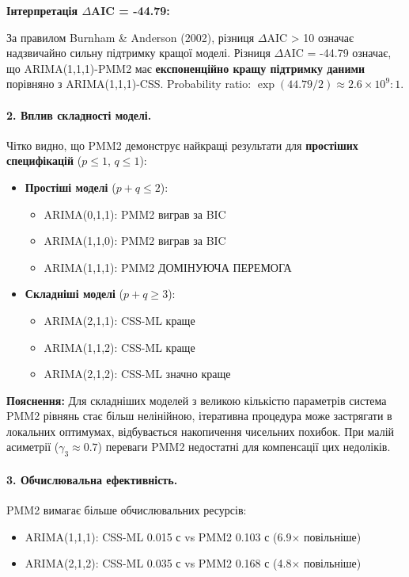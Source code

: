 \documentclass[12pt,a4paper]{article}
\begin{document}
\noindent\textbf{Інтерпретація $\Delta$AIC = -44.79:}

За правилом Burnham \& Anderson (2002), різниця $\Delta$AIC > 10 означає надзвичайно сильну підтримку кращої моделі. Різниця $\Delta$AIC = -44.79 означає, що ARIMA(1,1,1)-PMM2 має \textbf{експоненційно кращу підтримку даними} порівняно з ARIMA(1,1,1)-CSS. Probability ratio: $\exp(44.79/2) \approx 2.6 \times 10^9 : 1$.

\paragraph{2. Вплив складності моделі.}
Чітко видно, що PMM2 демонструє найкращі результати для \textbf{простіших специфікацій} ($p \leq 1$, $q \leq 1$):

\begin{itemize}
    \item \textbf{Простіші моделі} ($p+q \leq 2$):
    \begin{itemize}
        \item ARIMA(0,1,1): PMM2 виграв за BIC
        \item ARIMA(1,1,0): PMM2 виграв за BIC
        \item ARIMA(1,1,1): PMM2 ДОМІНУЮЧА ПЕРЕМОГА
    \end{itemize}

    \item \textbf{Складніші моделі} ($p+q \geq 3$):
    \begin{itemize}
        \item ARIMA(2,1,1): CSS-ML краще
        \item ARIMA(1,1,2): CSS-ML краще
        \item ARIMA(2,1,2): CSS-ML значно краще
    \end{itemize}
\end{itemize}

\noindent\textbf{Пояснення:} Для складніших моделей з великою кількістю параметрів система PMM2 рівнянь стає більш нелінійною, ітеративна процедура може застрягати в локальних оптимумах, відбувається накопичення чисельних похибок. При малій асиметрії ($\gamma_3 \approx 0.7$) переваги PMM2 недостатні для компенсації цих недоліків.

\paragraph{3. Обчислювальна ефективність.}
PMM2 вимагає більше обчислювальних ресурсів:
\begin{itemize}
    \item ARIMA(1,1,1): CSS-ML 0.015 с vs PMM2 0.103 с (6.9$\times$ повільніше)
    \item ARIMA(2,1,2): CSS-ML 0.035 с vs PMM2 0.168 с (4.8$\times$ повільніше)
\end{itemize}
\end{document}
